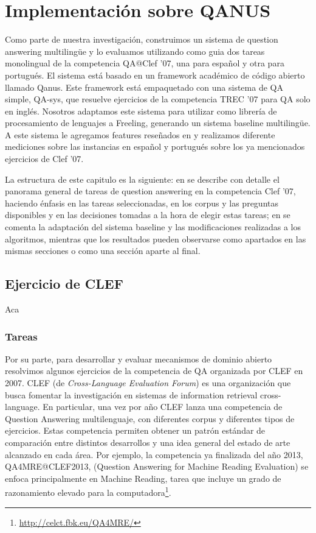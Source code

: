 \chapter{Implementación sobre QANUS}
\label{chap:qanus}
Como parte de nuestra investigación, construimos un sistema de question answering multilingüe y lo evaluamos utilizando como guia dos tareas monolingual de la competencia QA@Clef '07, una para español y otra para portugués. El sistema está basado en un framework académico de código abierto llamado Qanus. Este framework está empaquetado con una sistema de QA simple, QA-sys, que resuelve ejercicios de la competencia TREC '07 para QA solo en inglés. Nosotros adaptamos este sistema para utilizar como librería de procesamiento de lenguajes a Freeling, generando un sistema baseline multilingüe. A este sistema le agregamos features reseñados en  y realizamos diferente mediciones sobre las instancias en español y portugués sobre los ya mencionados ejercicios de Clef '07.

La estructura de este capitulo es la siguiente: en  se describe con detalle el panorama general de tareas de question answering en la competencia Clef '07, haciendo énfasis en las tareas seleccionadas, en los corpus y las preguntas disponibles y en las decisiones tomadas a la hora de elegir estas tareas; en  se comenta la adaptación del sistema baseline y las modificaciones realizadas a los algoritmos, {\color{red}mientras que los resultados pueden observarse como apartados en las mismas secciones o como una sección aparte al final}.

\section{Ejercicio de CLEF}
\label{sec:ejecicio-de-clef}
Aca
\subsection{Tareas}
\label{subsec:tareas}
Por su parte, para desarrollar y evaluar mecanismos de dominio abierto resolvimos algunos ejercicios de la competencia de QA organizada por CLEF 
en 2007. 
CLEF (de \textit{Cross-Language Evaluation Forum}) es una organización que busca fomentar la investigación en sistemas de information retrieval cross-language. 
En particular, una vez por año CLEF lanza una competencia de Question Answering multilenguaje, con diferentes corpus y diferentes tipos de ejercicios. Estas competencia permiten obtener un patrón estándar de comparación entre distintos desarrollos y una idea general del estado de arte alcanzado en cada área.
Por ejemplo, la competencia ya finalizada del año 2013, QA4MRE@CLEF2013, (Question Answering for Machine Reading Evaluation) se enfoca principalmente en Machine Reading, tarea que incluye un grado de razonamiento elevado para la computadora\footnote{\url{http://celct.fbk.eu/QA4MRE/}}.

